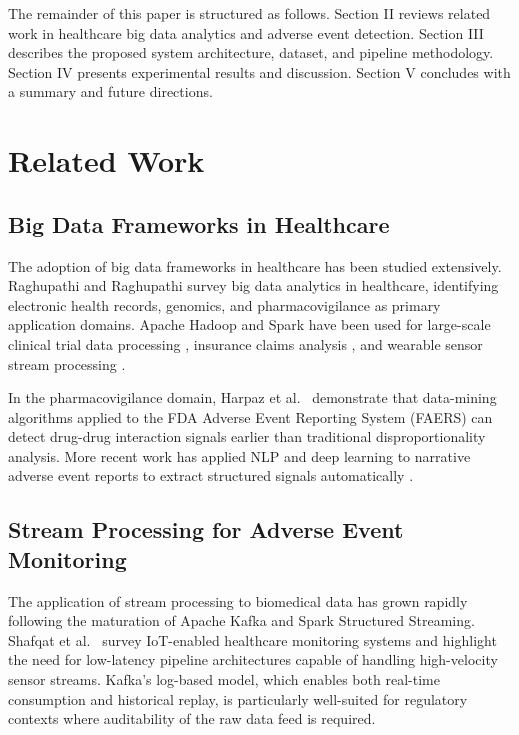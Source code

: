 \documentclass[conference]{IEEEtran}
\begin{document}
The remainder of this paper is structured as follows. Section II reviews related work in healthcare big data analytics and adverse event detection. Section III describes the proposed system architecture, dataset, and pipeline methodology. Section IV presents experimental results and discussion. Section V concludes with a summary and future directions.

\section{Related Work}

\subsection{Big Data Frameworks in Healthcare}

The adoption of big data frameworks in healthcare has been studied extensively. Raghupathi and Raghupathi \cite{raghupathi2014} survey big data analytics in healthcare, identifying electronic health records, genomics, and pharmacovigilance as primary application domains. Apache Hadoop and Spark have been used for large-scale clinical trial data processing \cite{spark_clinical}, insurance claims analysis \cite{claims}, and wearable sensor stream processing \cite{iot_health}.

In the pharmacovigilance domain, Harpaz et al.\ \cite{harpaz2012} demonstrate that data-mining algorithms applied to the FDA Adverse Event Reporting System (FAERS) can detect drug-drug interaction signals earlier than traditional disproportionality analysis. More recent work has applied NLP and deep learning to narrative adverse event reports to extract structured signals automatically \cite{nlp_ade}.

\subsection{Stream Processing for Adverse Event Monitoring}

The application of stream processing to biomedical data has grown rapidly following the maturation of Apache Kafka and Spark Structured Streaming. Shafqat et al.\ \cite{shafqat2020} survey IoT-enabled healthcare monitoring systems and highlight the need for low-latency pipeline architectures capable of handling high-velocity sensor streams. Kafka's log-based model, which enables both real-time consumption and historical replay, is particularly well-suited for regulatory contexts where auditability of the raw data feed is required.
\end{document}
